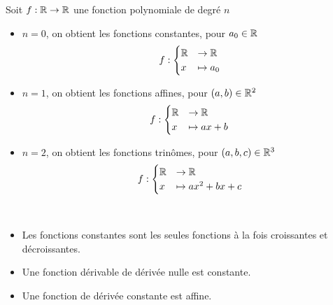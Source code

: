 \begin{graybox}
	\begin{proposition}[]
		\par Soit $f:\mathbb{R} \to \mathbb{R}$ une fonction polynomiale de degré $n$
		\begin{itemize}
			\item $n = 0$, on obtient les fonctions constantes, pour $a_0 \in \mathbb{R}$
			\begin{align*}
				f:
				\begin{cases}
					\mathbb{R} &\to \mathbb{R} \\
					x &\mapsto a_0
				\end{cases}
			\end{align*}
			\item $n = 1$, on obtient les fonctions affines, pour $(a, b) \in \mathbb{R}^2$
			\begin{align*}
				f:
				\begin{cases}
					\mathbb{R} &\to \mathbb{R} \\
					x &\mapsto ax + b
				\end{cases}
			\end{align*}
			\item $n = 2$, on obtient les fonctions trinômes, pour $(a, b, c) \in \mathbb{R}^3$
			\begin{align*}
				f:
				\begin{cases}
					\mathbb{R} &\to \mathbb{R} \\
					x &\mapsto ax^2 + bx + c
				\end{cases}
			\end{align*}
		\end{itemize}
	\end{proposition}
\end{graybox} 


\begin{remarque}~
	\begin{itemize}
		\item Les fonctions constantes sont les seules fonctions à la fois croissantes et décroissantes.
		\item Une fonction dérivable de dérivée nulle est constante.
		\item Une fonction de dérivée constante est affine.
	\end{itemize}
\end{remarque}


